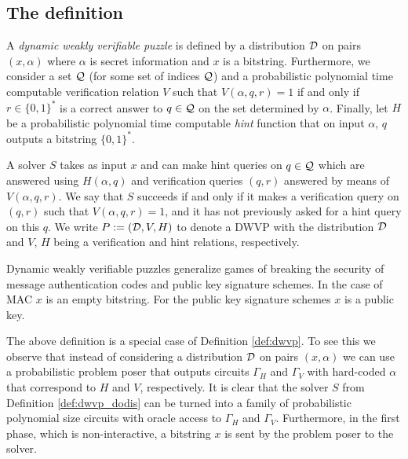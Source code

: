 \subsection{The definition}
\begin{definition}
  \label{def:dwvp_dodis}
  A \textit{dynamic weakly verifiable puzzle} is defined by a distribution $\mathcal{D}$ on pairs $(x, \alpha)$ where
  $\alpha$ is secret information and $x$ is a bitstring.
  Furthermore, we consider a set $\mathcal{Q}$ (for some set of indices $\mathcal{Q}$) and a probabilistic polynomial time computable verification relation $V$ such that
  $V(\alpha, q, r) = 1$ if and only if $r \in \{0,1\}^{*}$ is a correct answer to $q \in \mathcal{Q}$
  on the set determined by $\alpha$. Finally, let $H$ be a probabilistic polynomial time computable \textit{hint} function
  that on input $\alpha$, $q$ outputs a bitstring $\{0,1\}^{*}$.

  A solver $S$ takes as input $x$ and can make hint queries on $q \in \mathcal{Q}$ which are answered using $H(\alpha, q)$ and verification
  queries $(q,r)$ answered by means of $V(\alpha, q, r)$.
  We say that $S$ succeeds if and only if it makes a verification query on $(q,r)$ such that
  $V(\alpha,q,r) = 1$, and it has not previously asked for a hint query on this $q$.
  We write $P := (\mathcal{D}, V, H)$ to denote a DWVP with the distribution $\mathcal{D}$ and $V$, $H$ being a verification and hint relations, respectively.
\end{definition}
%
Dynamic weakly verifiable puzzles generalize games of breaking the security of message authentication codes and public key signature schemes.
In the case of MAC $x$ is an empty bitstring. For the public key signature schemes $x$ is a public key.

The above definition is a special case of Definition \ref{def:dwvp}.
To see this we observe that instead of considering a distribution $\mathcal{D}$ on pairs $(x,\alpha)$
we can use a probabilistic problem poser that outputs circuits $\Gamma_H$ and $\Gamma_V$ with hard-coded $\alpha$ that correspond to $H$ and $V$, respectively.
It is clear that the solver $S$ from Definition \ref{def:dwvp_dodis} can be turned into a family of probabilistic polynomial size circuits
with oracle access to $\Gamma_H$ and $\Gamma_V$. Furthermore, in the first phase, which is non-interactive,
a bitstring $x$ is sent by the problem poser to the solver.

